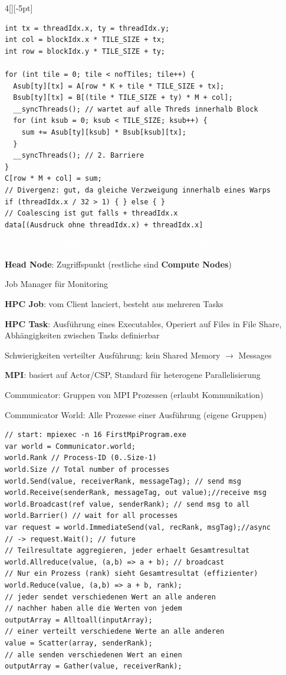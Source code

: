 \documentclass[%
	pdftex,%
	a4paper,%
	landscape,%
	ngerman,
	oneside,%
	6pt,%
	halfparskip,%
]{scrbook}
\newenvironment{mainbox}{%
  \def\FrameCommand{\fboxrule 1px \fcolorbox{black}{spec_blue}}%
  \MakeFramed {\advance\hsize-\width \FrameRestore}}%
 {\endMakeFramed}
\newcommand{\maintopic}[1]{\setcounter{subtopicenum}{0}\setcounter{subsubtopicenum}{0}\vspace{-4px}\begin{mainbox}\textcolor{white}{\textbf{\large{\stepcounter{maintopicenum}\Roman{maintopicenum}. #1}}}\end{mainbox}\vspace{-4px}}
\newenvironment{tight-itemize}
{ \begin{itemize}[leftmargin=*, nosep]
    \setlength{\itemsep}{0px}
    \setlength{\parskip}{0px}
    \setlength{\parsep}{0px}  }
{ \end{itemize}                  }
\begin{document}
\begin{multicols}{4}[][-5pt]
\begin{lstlisting}
int tx = threadIdx.x, ty = threadIdx.y;
int col = blockIdx.x * TILE_SIZE + tx;
int row = blockIdx.y * TILE_SIZE + ty;

for (int tile = 0; tile < nofTiles; tile++) {
  Asub[ty][tx] = A[row * K + tile * TILE_SIZE + tx];
  Bsub[ty][tx] = B[(tile * TILE_SIZE + ty) * M + col];
  __syncThreads(); // wartet auf alle Threds innerhalb Block
  for (int ksub = 0; ksub < TILE_SIZE; ksub++) {
    sum += Asub[ty][ksub] * Bsub[ksub][tx];
  }
  __syncThreads(); // 2. Barriere
}
C[row * M + col] = sum;
// Divergenz: gut, da gleiche Verzweigung innerhalb eines Warps
if (threadIdx.x / 32 > 1) { } else { }
// Coalescing ist gut falls + threadIdx.x
data[(Ausdruck ohne threadIdx.x) + threadIdx.x]
\end{lstlisting}
\maintopic{Cluster und High-Performance Computing (HPC)}
\begin{tight-itemize}
	\item{\textbf{Head Node}: Zugriffspunkt (restliche sind \textbf{Compute Nodes})}
	\item{Job Manager für Monitoring}
	\item{\textbf{HPC Job}: vom Client lanciert, besteht aus mehreren Tasks}
	\item{\textbf{HPC Task}: Ausführung eines Executables, Operiert auf Files in File Share, Abhängigkeiten zwischen Tasks definierbar}
	\item{Schwierigkeiten verteilter Ausführung: kein Shared Memory $\rightarrow$ Messages} 
	\item{\textbf{MPI}: basiert auf Actor/CSP, Standard für heterogene Parallelisierung}
	\item{Communicator: Gruppen von MPI Prozessen (erlaubt Kommunikation)}
	\item{Communicator World: Alle Prozesse einer Ausführung (eigene Gruppen)}
\end{tight-itemize}

\begin{lstlisting}
// start: mpiexec -n 16 FirstMpiProgram.exe
var world = Communicator.world;
world.Rank // Process-ID (0..Size-1)
world.Size // Total number of processes
world.Send(value, receiverRank, messageTag); // send msg
world.Receive(senderRank, messageTag, out value);//receive msg
world.Broadcast(ref value, senderRank); // send msg to all
world.Barrier() // wait for all processes
var request = world.ImmediateSend(val, recRank, msgTag);//async
// -> request.Wait(); // future
// Teilresultate aggregieren, jeder erhaelt Gesamtresultat
world.Allreduce(value, (a,b) => a + b); // broadcast
// Nur ein Prozess (rank) sieht Gesamtresultat (effizienter)
world.Reduce(value, (a,b) => a + b, rank);
// jeder sendet verschiedenen Wert an alle anderen
// nachher haben alle die Werten von jedem
outputArray = Alltoall(inputArray);
// einer verteilt verschiedene Werte an alle anderen
value = Scatter(array, senderRank);
// alle senden verschiedenen Wert an einen
outputArray = Gather(value, receiverRank);
\end{lstlisting}


\end{multicols}
\end{document}
